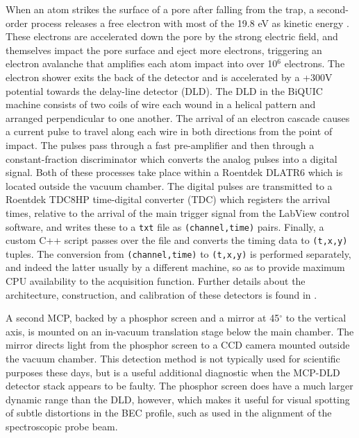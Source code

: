 	When an atom strikes the surface of a pore after falling from the trap, a second-order process releases a free electron with most of the 19.8 eV as kinetic energy \cite{Jagutzi02,Hotop96}.
	These electrons are accelerated down the pore by the strong electric field, and themselves impact the pore surface and eject more electrons, triggering an electron avalanche that amplifies each atom impact into over 10$^6$ electrons.
	The electron shower exits the back of the detector and is accelerated by a +300V potential towards the delay-line detector (DLD).
	The DLD in the BiQUIC machine consists of two coils of wire each wound in a helical pattern and arranged perpendicular to one another.
	 The arrival of an electron cascade causes a current pulse to travel along each wire in both directions from the point of impact.
	The pulses pass through a fast pre-amplifier and then through a constant-fraction discriminator which converts the analog pulses into a digital signal.
	Both of these processes take place within a Roentdek DLATR6 which is located outside the vacuum chamber.
	The digital pulses are transmitted to a Roentdek TDC8HP time-digital converter (TDC) which registers the arrival times, relative to the arrival of the main trigger signal from the LabView control software, and writes these to a \verb|txt| file as \verb|(channel,time)| pairs.
	Finally, a custom C++ script passes over the file and converts the timing data to \verb|(t,x,y)| tuples.
	The conversion from \verb|(channel,time)| to \verb|(t,x,y)| is performed separately, and indeed the latter usually by a different machine, so as to provide maximum CPU availability to the acquisition function.	Further details about the architecture, construction, and calibration of these detectors is found in \cite{HodgmanThesis,ManningThesis}.

	A second MCP, backed by a phosphor screen and a mirror at 45$^\circ$ to the vertical axis, is mounted on an in-vacuum translation stage below the main chamber.
	The mirror directs light from the phosphor screen to a CCD camera mounted outside the vacuum chamber.
	This detection method is not typically used for scientific purposes these days, but is a useful additional diagnostic when the MCP-DLD detector stack appears to be faulty.
	The phosphor screen does have a much larger dynamic range than the DLD, however, which makes it useful for visual spotting of subtle distortions in the BEC profile, such as used in the alignment of the spectroscopic probe beam.
	


